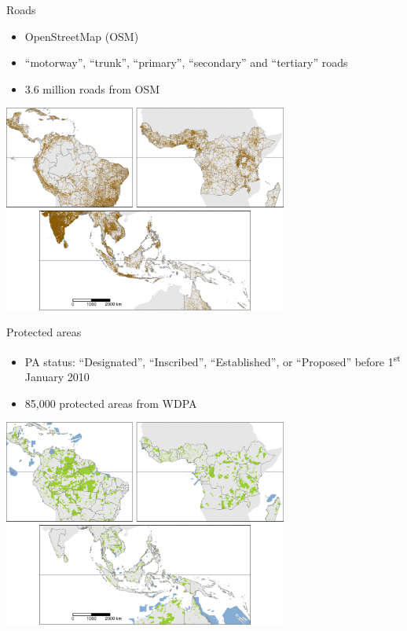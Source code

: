 \documentclass[10pt,table,dvipsnames,compress]{beamer}
\begin{document}
\begin{frame}[label={sec:org4e5ce09}]{Roads}
\begin{itemize}
\item OpenStreetMap (OSM)
\item ``motorway'', ``trunk'', ``primary'', ``secondary'' and ``tertiary'' roads
\item 3.6 million roads from OSM
\end{itemize}

\centering \includegraphics[width=0.7\textwidth]{figs/sm/roads.png}
\end{frame}

\begin{frame}[label={sec:org5184ae6}]{Protected areas}
\begin{itemize}
\item PA status: ``Designated'', ``Inscribed'', ``Established'', or ``Proposed''
before 1\textsuperscript{st} January 2010
\item 85,000 protected areas from WDPA
\end{itemize}

\centering \includegraphics[width=0.7\textwidth]{figs/sm/pa.png}
\end{frame}
\end{document}
